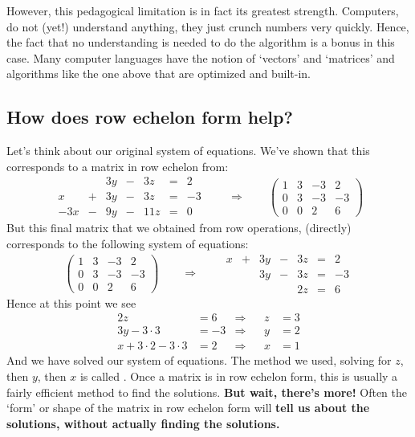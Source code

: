 \documentclass{ximera}
\begin{document}
However, this pedagogical limitation is in fact its greatest
strength. Computers, do not (yet!) understand anything, they just
crunch numbers very quickly. Hence, the fact that no understanding is
needed to do the algorithm is a bonus in this case. Many computer
languages have the notion of `vectors' and `matrices' and algorithms
like the one above that are optimized and built-in.




\subsection{How does row echelon form help?}

Let's think about our original system of equations. We've shown that
this corresponds to a matrix in row echelon from:
\[
\begin{array}{ccccccc}
       & & 3y &-& 3z &=& 2 \\
     x& +&3y&-&3z&=&-3\\
     -3x& -&9y&-&11z&=&0
\end{array}
\qquad\Longrightarrow\qquad
\left(\begin{array}{ccc|c}
  1 &   3 & -3 & 2  \\
  0 &   3 & -3 & -3 \\
  0& 0  & 2 & 6
\end{array}\right)
\]
But this final matrix that we obtained from row operations, (directly)
corresponds to the following system of equations:
\[
\left(\begin{array}{ccc|c}
  1 &   3 & -3 & 2  \\
  0 &   3 & -3 & -3 \\
  0& 0  & 2 & 6
\end{array}\right)
\qquad\Longrightarrow\qquad
\begin{array}{ccccccc}
     x  &+ & 3y &-& 3z &=& 2 \\
     &  &3y&-&3z&=&-3\\
     & & & &2z&=&6
\end{array}
\]
Hence at this point we see
\begin{align*}
  2z &= 6 &\Rightarrow  & & z &= 3\\
  3y-3\cdot 3 &= -3 &\Rightarrow  & & y &= 2\\
  x + 3\cdot 2 - 3\cdot 3 &= 2  &\Rightarrow & & x &= 1
\end{align*}
And we have solved our system of equations. The method we used,
solving for $z$, then $y$, then $x$ is called . Once a matrix is in row echelon form, this is usually
a fairly efficient method to find the solutions.  \textbf{But wait,
  there's more!}  Often the `form' or shape of the matrix in row
echelon form will \textbf{tell us about the solutions, without
  actually finding the solutions.}
\end{document}
